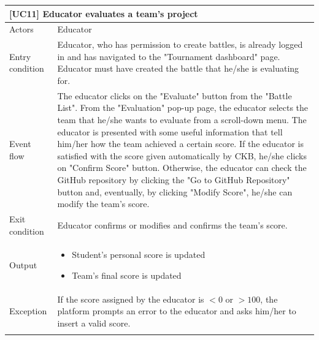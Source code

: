 \documentclass[12pt,oneside,a4paper]{article}
\begin{document}
\clearpage

\begin{table}[htbp]
\begin{tabular}{|l|p{12cm}|}
    \hline
    \multicolumn{2}{|l|}{\textbf{[UC11] Educator evaluates a team's project}}\\
    \hline
    Actors & Educator\\
    \hline
    Entry condition & Educator, who has permission to create battles, is already logged in and has navigated to the "Tournament dashboard" page. Educator must have created the battle that he/she is evaluating for.\\
    \hline
    Event flow & The educator clicks on the "Evaluate" button from the "Battle List". From the "Evaluation" pop-up page, the educator selects the team that he/she wants to evaluate from a scroll-down menu. The educator is presented with some useful information that tell him/her how the team achieved a certain score. If the educator is satisfied with the score given automatically by CKB, he/she clicks on "Confirm Score" button. Otherwise, the educator can check the GitHub repository by clicking the "Go to GitHub Repository" button and, eventually, by clicking "Modify Score", he/she can modify the team's score.\\
    \hline
    Exit condition & Educator confirms or modifies and confirms the team's score.\\
    \hline
    Output & \begin{itemize}
        \item Student's personal score is updated
        \item Team's final score is updated
    \end{itemize}\\
    \hline
    Exception & If the score assigned by the educator is $< 0$ or $> 100$, the platform prompts an error to the educator and asks him/her to insert a valid score.\\
    \lasthline
\end{tabular}
\end{table}

\clearpage
\end{document}

